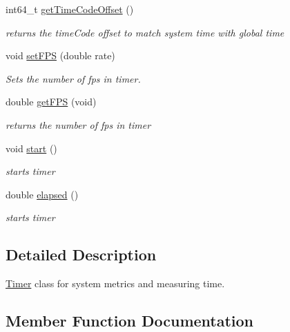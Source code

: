 \begin{DoxyCompactItemize}
\item 
int64\+\_\+t \hyperlink{classatl_1_1Timer_ae0a3c319cebe9dda92f387c3aa9614c5}{get\+Time\+Code\+Offset} ()
\begin{DoxyCompactList}\small\item\em returns the time\+Code offset to match system time with global time \end{DoxyCompactList}\item 
void \hyperlink{classatl_1_1Timer_a26780500e53109edff3e29b8131925ff}{set\+F\+PS} (double rate)
\begin{DoxyCompactList}\small\item\em Sets the number of fps in timer. \end{DoxyCompactList}\item 
double \hyperlink{classatl_1_1Timer_a2636e89510959306d4943f77329be346}{get\+F\+PS} (void)\hypertarget{classatl_1_1Timer_a2636e89510959306d4943f77329be346}{}\label{classatl_1_1Timer_a2636e89510959306d4943f77329be346}

\begin{DoxyCompactList}\small\item\em returns the number of fps in timer \end{DoxyCompactList}\item 
void \hyperlink{classatl_1_1Timer_ab95b1b5e58bf006e18a7f3e95b2e3bfd}{start} ()
\begin{DoxyCompactList}\small\item\em starts timer \end{DoxyCompactList}\item 
double \hyperlink{classatl_1_1Timer_af0e48d33458328ccc830a6b924ee9be5}{elapsed} ()
\begin{DoxyCompactList}\small\item\em starts timer \end{DoxyCompactList}\end{DoxyCompactItemize}


\subsection{Detailed Description}
\hyperlink{classatl_1_1Timer}{Timer} class for system metrics and measuring time. 

\subsection{Member Function Documentation}
